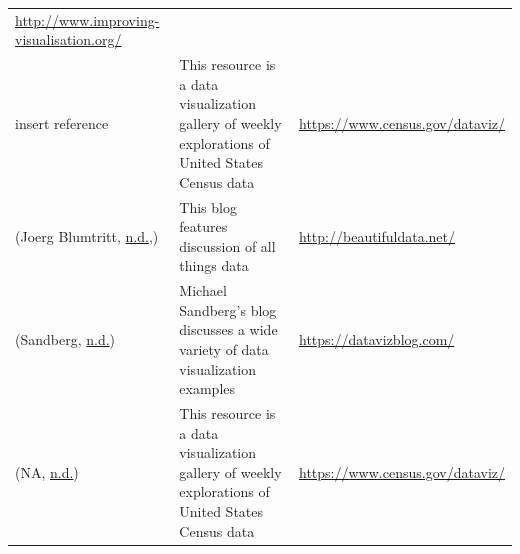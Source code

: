 \documentclass[]{book}
\begin{document}
\begin{longtable}[]{@{}lll@{}}
\begin{minipage}[t]{0.48\columnwidth}
\url{http://www.improving-visualisation.org/}\strut
\end{minipage}\tabularnewline
\begin{minipage}[t]{0.15\columnwidth}\raggedright
insert reference\strut
\end{minipage} & \begin{minipage}[t]{0.28\columnwidth}\raggedright
This resource is a data visualization gallery of weekly explorations of United States Census data\strut
\end{minipage} & \begin{minipage}[t]{0.48\columnwidth}\raggedright
\url{https://www.census.gov/dataviz/}\strut
\end{minipage}\tabularnewline
\begin{minipage}[t]{0.15\columnwidth}\raggedright
(Joerg Blumtritt, \protect\hyperlink{ref-Beautiful_data}{n.d.},)\strut
\end{minipage} & \begin{minipage}[t]{0.28\columnwidth}\raggedright
This blog features discussion of all things data\strut
\end{minipage} & \begin{minipage}[t]{0.48\columnwidth}\raggedright
\url{http://beautifuldata.net/}\strut
\end{minipage}\tabularnewline
\begin{minipage}[t]{0.15\columnwidth}\raggedright
(Sandberg, \protect\hyperlink{ref-Michael_Sandberg_blog}{n.d.})\strut
\end{minipage} & \begin{minipage}[t]{0.28\columnwidth}\raggedright
Michael Sandberg's blog discusses a wide variety of data visualization examples\strut
\end{minipage} & \begin{minipage}[t]{0.48\columnwidth}\raggedright
\url{https://datavizblog.com/}\strut
\end{minipage}\tabularnewline
\begin{minipage}[t]{0.15\columnwidth}\raggedright
(NA, \protect\hyperlink{ref-data_viz_gallery}{n.d.})\strut
\end{minipage} & \begin{minipage}[t]{0.28\columnwidth}\raggedright
This resource is a data visualization gallery of weekly explorations of United States Census data\strut
\end{minipage} & \begin{minipage}[t]{0.48\columnwidth}\raggedright
\url{https://www.census.gov/dataviz/}\strut

\end{minipage}
\end{longtable}
\end{document}
